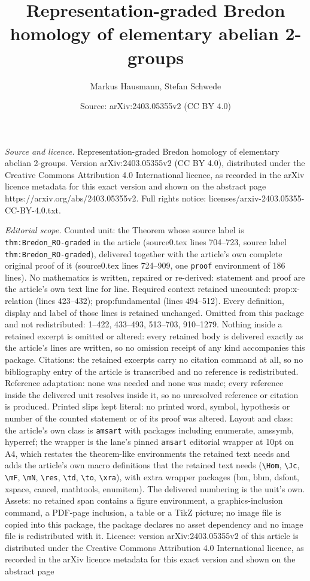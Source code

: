 \documentclass[10pt,a4paper]{amsart}
\title[Representation-graded Bredon homology of elementary abelian ]{Representation-graded Bredon homology of elementary abelian 2-groups}
\author{Markus Hausmann, Stefan Schwede}
\date{Source: arXiv:2403.05355v2 (CC BY 4.0)}
\begin{document}
\maketitle

\noindent\emph{Source and licence.} Representation-graded Bredon homology of elementary abelian 2-groups. Version arXiv:2403.05355v2 (CC BY 4.0), distributed under the Creative Commons Attribution 4.0 International licence, as recorded in the arXiv licence metadata for this exact version and shown on the abstract page https://arxiv.org/abs/2403.05355v2. Full rights notice: licenses/arxiv-2403.05355-CC-BY-4.0.txt.\par\smallskip

\noindent\textit{Editorial scope.} Counted unit: the Theorem whose source label is \texttt{thm:Bredon\_RO-graded} in the article (source0.tex lines 704--723, source label \texttt{thm:Bredon\_RO-graded}), delivered together with the article's own complete original proof of it (source0.tex lines 724--909, one \texttt{proof} environment of 186 lines). No mathematics is written, repaired or re-derived: statement and proof are the article's own text line for line. Required context retained uncounted: prop:x-relation (lines 423--432); prop:fundamental (lines 494--512). Every definition, display and label of those lines is retained unchanged. Omitted from this package and not redistributed: 1--422, 433--493, 513--703, 910--1279. Nothing inside a retained excerpt is omitted or altered: every retained body is delivered exactly as the article's lines are written, so no omission receipt of any kind accompanies this package. Citations: the retained excerpts carry no citation command at all, so no bibliography entry of the article is transcribed and no reference is redistributed. Reference adaptation: none was needed and none was made; every reference inside the delivered unit resolves inside it, so no unresolved reference or citation is produced. Printed slips kept literal: no printed word, symbol, hypothesis or number of the counted statement or of its proof was altered. Layout and class: the article's own class is \texttt{amsart} with packages including enumerate, amssymb, hyperref; the wrapper is the lane's pinned \texttt{amsart} editorial wrapper at 10pt on A4, which restates the theorem-like environments the retained text needs and adds the article's own macro definitions that the retained text needs (\texttt{\textbackslash Hom}, \texttt{\textbackslash Jc}, \texttt{\textbackslash mF}, \texttt{\textbackslash mN}, \texttt{\textbackslash res}, \texttt{\textbackslash td}, \texttt{\textbackslash to}, \texttt{\textbackslash xra}), with extra wrapper packages (bm, bbm, dsfont, xspace, cancel, mathtools, enumitem). The delivered numbering is the unit's own. Assets: no retained span contains a figure environment, a graphics-inclusion command, a PDF-page inclusion, a table or a TikZ picture; no image file is copied into this package, the package declares no asset dependency and no image file is redistributed with it. Licence: version arXiv:2403.05355v2 of this article is distributed under the Creative Commons Attribution 4.0 International licence, as recorded in the arXiv licence metadata for this exact version and shown on the abstract page 
\end{document}
